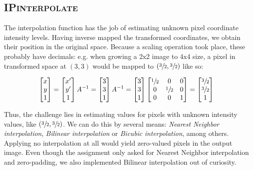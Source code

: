 \documentclass{article}
\begin{document}
\subsection*{\textsc{IPinterpolate}}
The interpolation function has the job of estimating unknown pixel coordinate intensity levels. Having inverse mapped the transformed coordinates, we obtain their position in the original space. Because a scaling operation took place, these probably have decimals: e.g. when growing a 2x2 image to 4x4 size, a pixel in transformed space at $(3, 3)$ would be mapped to $(\sfrac{3}{2}, \sfrac{3}{2})$ like so:

\begin{figure}[ht]
\[ 
\begin{bmatrix}
x \\ y \\ 1
\end{bmatrix} =
\begin{bmatrix}
x' \\ y' \\ 1
\end{bmatrix} A^{-1} =
\begin{bmatrix}
3 \\ 3 \\ 1
\end{bmatrix} A^{-1}=\begin{bmatrix}
3 \\ 3 \\ 1
\end{bmatrix} \begin{bmatrix}
\sfrac{1}{2} & 0 & 0\\
0 & \sfrac{1}{2} & 0\\
0 & 0 & 1
\end{bmatrix}=\begin{bmatrix}\sfrac{3}{2} \\ \sfrac{3}{2} \\ 1
\end{bmatrix}
 \]
\end{figure}

Thus, the challenge lies in estimating values for pixels with unknown intensity values, like $(\sfrac{3}{2}, \sfrac{3}{2})$. We can do this by several means: \textit{Nearest Neighbor interpolation}, \textit{Bilinear interpolation} or \textit{Bicubic interpolation}, among others. Applying no interpolation at all would yield zero-valued pixels in the output image. Even though the assignment only asked for Nearest Neighbor interpolation and zero-padding, we also implemented Bilinear interpolation out of curiosity.
\end{document}
